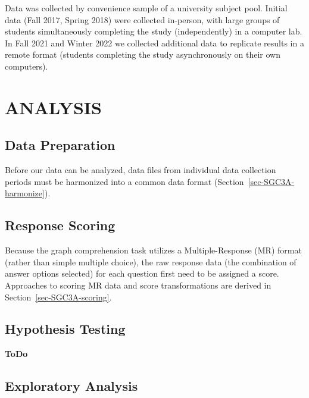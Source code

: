 \documentclass[
  letterpaper,
  DIV=11,
  numbers=noendperiod]{scrreprt}
\begin{document}
Data was collected by convenience sample of a university subject pool.
Initial data (Fall 2017, Spring 2018) were collected in-person, with
large groups of students simultaneously completing the study
(independently) in a computer lab. In Fall 2021 and Winter 2022 we
collected additional data to replicate results in a remote format
(students completing the study asynchronously on their own computers).

\hypertarget{analysis}{%
\section*{ANALYSIS}\label{analysis}}

\hypertarget{data-preparation}{%
\subsection*{Data Preparation}\label{data-preparation}}

Before our data can be analyzed, data files from individual data
collection periods must be harmonized into a common data format
(Section~\ref{sec-SGC3A-harmonize}).

\hypertarget{response-scoring}{%
\subsection*{Response Scoring}\label{response-scoring}}

Because the graph comprehension task utilizes a Multiple-Response (MR)
format (rather than simple multiple choice), the raw response data (the
combination of answer options selected) for each question first need to
be assigned a score. Approaches to scoring MR data and score
transformations are derived in Section~\ref{sec-SGC3A-scoring}.

\hypertarget{hypothesis-testing}{%
\subsection*{Hypothesis Testing}\label{hypothesis-testing}}

\textbf{ToDo}

\hypertarget{exploratory-analysis}{%
\subsection*{Exploratory Analysis}\label{exploratory-analysis}}
\end{document}
